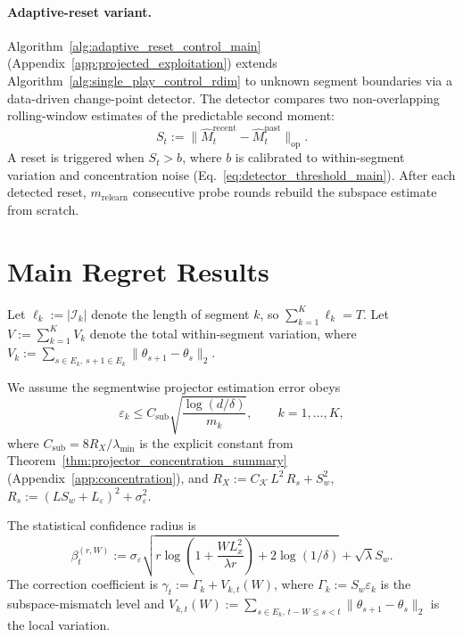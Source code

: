 \documentclass{article}
\newcommand{\op}{\mathrm{op}}
\newcommand{\cI}{\mathcal{I}}
\begin{document}
\paragraph{Adaptive-reset variant.}
Algorithm~\ref{alg:adaptive_reset_control_main} (Appendix~\ref{app:projected_exploitation}) extends Algorithm~\ref{alg:single_play_control_rdim} to unknown segment boundaries via a data-driven change-point detector.
The detector compares two non-overlapping rolling-window estimates of the predictable second moment:
\begin{equation}
S_t := \|\widehat M_t^{\mathrm{recent}} - \widehat M_t^{\mathrm{past}}\|_{\op}.
\label{eq:detector_stat}
\end{equation}
A reset is triggered when $S_t > b$, where $b$ is calibrated to within-segment variation and concentration noise (Eq.~\eqref{eq:detector_threshold_main}).
After each detected reset, $m_{\mathrm{relearn}}$ consecutive probe rounds rebuild the subspace estimate from scratch.

\section{Main Regret Results}
\label{sec:theory}

Let $\ell_k := |\cI_k|$ denote the length of segment $k$, so $\sum_{k=1}^K \ell_k = T$.
Let $V := \sum_{k=1}^K V_k$ denote the total within-segment variation, where $V_k := \sum_{s\in E_k,\,s+1\in E_k}\|\theta_{s+1}-\theta_s\|_2$.

We assume the segmentwise projector estimation error obeys
\begin{equation}
\varepsilon_k \le C_{\mathrm{sub}} \sqrt{\frac{\log(d/\delta)}{m_k}},
\qquad k=1,\dots,K,
\label{eq:eps_k_rate}
\end{equation}
where $C_{\mathrm{sub}} = 8R_X/\lambda_{\min}$ is the explicit constant from Theorem~\ref{thm:projector_concentration_summary} (Appendix~\ref{app:concentration}), and $R_X := C_{\mathcal K}\,L^2\,R_s + S_w^2$, $R_s := (LS_w + L_\varepsilon)^2 + \sigma_\varepsilon^2$.

The statistical confidence radius is
\begin{equation}
\beta_t^{(r,W)} := \sigma_\varepsilon
\sqrt{r \log\!\left(1+\frac{W L_x^2}{\lambda r}\right) + 2\log(1/\delta)} + \sqrt{\lambda}S_w.
\label{eq:beta_rW}
\end{equation}
The correction coefficient is $\gamma_t := \Gamma_k + V_{k,t}(W)$, where $\Gamma_k := S_w \varepsilon_k$ is the subspace-mismatch level and $V_{k,t}(W) := \sum_{s\in E_k,\, t-W \le s < t}\|\theta_{s+1}-\theta_s\|_2$ is the local variation.
\end{document}
